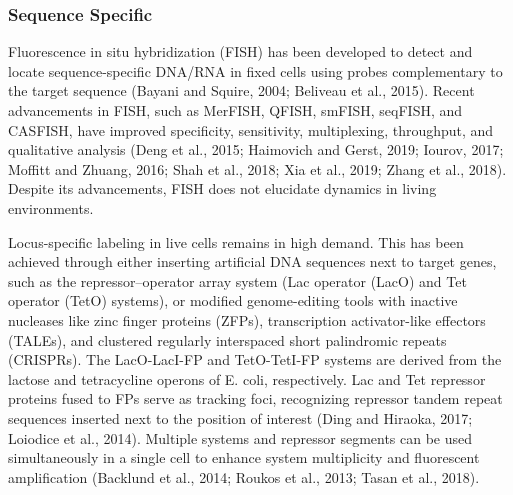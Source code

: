 \subsubsection{Sequence Specific}

Fluorescence in situ hybridization (FISH) has been developed to detect and locate sequence-specific DNA/RNA in fixed cells using probes complementary to the target sequence (Bayani and Squire, 2004; Beliveau et al., 2015). Recent advancements in FISH, such as MerFISH, QFISH, smFISH, seqFISH, and CASFISH, have improved specificity, sensitivity, multiplexing, throughput, and qualitative analysis (Deng et al., 2015; Haimovich and Gerst, 2019; Iourov, 2017; Moffitt and Zhuang, 2016; Shah et al., 2018; Xia et al., 2019; Zhang et al., 2018). Despite its advancements, FISH does not elucidate dynamics in living environments.

Locus-specific labeling in live cells remains in high demand. This has been achieved through either inserting artificial DNA sequences next to target genes, such as the repressor–operator array system (Lac operator (LacO) and Tet operator (TetO) systems), or modified genome-editing tools with inactive nucleases like zinc finger proteins (ZFPs), transcription activator-like effectors (TALEs), and clustered regularly interspaced short palindromic repeats (CRISPRs). The LacO-LacI-FP and TetO-TetI-FP systems are derived from the lactose and tetracycline operons of E. coli, respectively. Lac and Tet repressor proteins fused to FPs serve as tracking foci, recognizing repressor tandem repeat sequences inserted next to the position of interest (Ding and Hiraoka, 2017; Loiodice et al., 2014). Multiple systems and repressor segments can be used simultaneously in a single cell to enhance system multiplicity and fluorescent amplification (Backlund et al., 2014; Roukos et al., 2013; Tasan et al., 2018).

